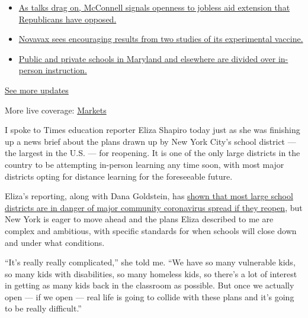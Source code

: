 \begin{itemize}
\tightlist
\item
  \href{https://www.nytimes3xbfgragh.onion/2020/08/04/world/coronavirus-cases.html?action=click\&pgtype=Article\&state=default\&region=MAIN_CONTENT_1\&context=storylines_live_updates\#link-2daa96b5}{As
  talks drag on, McConnell signals openness to jobless aid extension
  that Republicans have opposed.}
\item
  \href{https://www.nytimes3xbfgragh.onion/2020/08/04/world/coronavirus-cases.html?action=click\&pgtype=Article\&state=default\&region=MAIN_CONTENT_1\&context=storylines_live_updates\#link-1228a480}{Novavax
  sees encouraging results from two studies of its experimental
  vaccine.}
\item
  \href{https://www.nytimes3xbfgragh.onion/2020/08/04/world/coronavirus-cases.html?action=click\&pgtype=Article\&state=default\&region=MAIN_CONTENT_1\&context=storylines_live_updates\#link-4825b93}{Public
  and private schools in Maryland and elsewhere are divided over
  in-person instruction.}
\end{itemize}

\href{https://www.nytimes3xbfgragh.onion/2020/08/04/world/coronavirus-cases.html?action=click\&pgtype=Article\&state=default\&region=MAIN_CONTENT_1\&context=storylines_live_updates}{See
more updates}

More live coverage:
\href{https://www.nytimes3xbfgragh.onion/live/2020/08/04/business/stock-market-today-coronavirus?action=click\&pgtype=Article\&state=default\&region=MAIN_CONTENT_1\&context=storylines_live_updates}{Markets}

I spoke to Times education reporter Eliza Shapiro today just as she was
finishing up a news brief about the plans drawn up by New York City's
school district --- the largest in the U.S. --- for reopening. It is one
of the only large districts in the country to be attempting in-person
learning any time soon, with most major districts opting for distance
learning for the foreseeable future.

Eliza's reporting, along with Dana Goldstein, has
\href{https://www.nytimes3xbfgragh.onion/2020/07/14/us/coronavirus-schools-fall.html}{shown
that most large school districts are in danger of major community
coronavirus spread if they reopen}, but New York is eager to move ahead
and the plans Eliza described to me are complex and ambitious, with
specific standards for when schools will close down and under what
conditions.

``It's really really complicated,'' she told me. ``We have so many
vulnerable kids, so many kids with disabilities, so many homeless kids,
so there's a lot of interest in getting as many kids back in the
classroom as possible. But once we actually open --- if we open --- real
life is going to collide with these plans and it's going to be really
difficult.''

